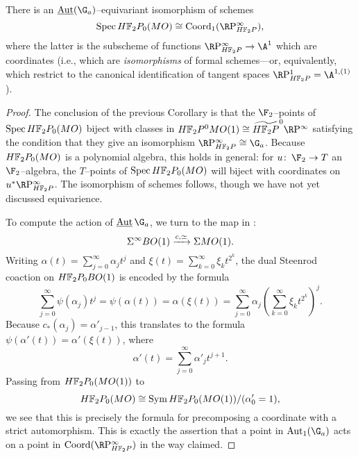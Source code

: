 \begin{corollary}
There is an \(\InternalAut(\G_a)\)--equivariant isomorphism of schemes \[\Spec \HFtwo P_0(MO) \cong \Coord_1(\RP^\infty_{\HFtwo P}),\] where the latter is the subscheme of functions \(\RP^\infty_{\HFtwo P} \to \A^1\) which are coordinates (i.e., which are \emph{isomorphisms} of formal schemes---or, equivalently, which restrict to the canonical identification of tangent spaces \(\RP^1_{\HFtwo P} = \A^{1,(1)}\)).
\end{corollary}
\begin{proof}
The conclusion of the previous Corollary is that the \(\F_2\)--points of \(\Spec \HFtwo P_0(MO)\) biject with classes in \(\HFtwo P^0 MO(1) \cong \widetilde{\HFtwo P}^0 \RP^\infty\) satisfying the condition that they give an isomorphism \(\RP^\infty_{\HFtwo P} \cong \G_a\).  Because \(\HFtwo P_0(MO)\) is a polynomial algebra, this holds in general: for \(u\co \F_2 \to T\) an \(\F_2\)--algebra, the \(T\)--points of \(\Spec \HFtwo P_0(MO)\) will biject with coordinates on \(u^* \RP^\infty_{\HFtwo P}\).  The isomorphism of schemes follows, though we have not yet discussed equivarience.

To compute the action of \(\InternalAut \G_a\), we turn to the map in : \[\Sigma^\infty BO(1) \xrightarrow{c, \simeq} \Sigma MO(1).\]  Writing \(\alpha(t) = \sum_{j=0}^\infty \alpha_j t^j\) and \(\xi(t) = \sum_{k=0}^\infty \xi_k t^{2^k}\), the dual Steenrod coaction on \(\HFtwo P_0 BO(1)\) is encoded by the formula \[\sum_{j=0}^\infty \psi(\alpha_j) t^j = \psi(\alpha(t)) = \alpha(\xi(t)) = \sum_{j=0}^\infty \alpha_j \left(\sum_{k=0}^\infty \xi_k t^{2^k} \right)^j.\]  Because \(c_*(\alpha_j) = \alpha'_{j-1}\), this translates to the formula \(\psi(\alpha'(t)) = \alpha'(\xi(t))\), where \[\alpha'(t) = \sum_{j=0}^\infty \alpha'_j t^{j+1}.\]  Passing from \(\HFtwo P_0(MO(1))\) to \[\HFtwo P_0(MO) \cong \Sym \HFtwo P_0(MO(1)) / (\alpha'_0 = 1),\] we see that this is precisely the formula for precomposing a coordinate with a strict automorphism.  This is exactly the assertion that a point in \(\Aut_1(\G_a)\) acts on a point in \(\Coord(\RP^\infty_{\HFtwo P})\) in the way claimed.
\end{proof}

